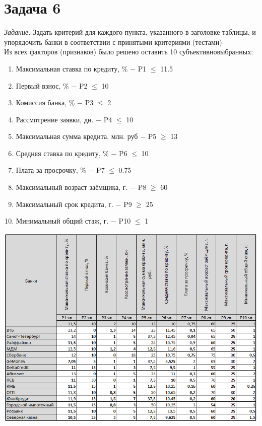 \documentclass[14pt,fleqn]{extarticle}
\begin{document}
	\section*{Задача 6}
	\textit{Задание:} Задать критерий для каждого пункта, указанного в заголовке таблицы, и упорядочить банки в соответствии с принятыми критериями (тестами)\\
	
	Из всех факторов (признаков) было решено оставить 10 субъективновыбранных:
	\begin{enumerate}[nolistsep]
		\item Максимальная ставка по кредиту, \% $-$ P1 $\leq$ 11.5
		\item Первый взнос, \% $-$ P2 $\leq$ 10
		\item Комиссия банка, \% $-$ P3 $\leq$ 2
		\item Рассмотрение заявки, дн. $-$ P4 $\leq$ 10
		\item Максимальная сумма кредита, млн. руб $-$ P5 $\geq$ 13
		\item Средняя ставка по кредиту, \% $-$ P6 $\leq$ 10
		\item Плата за просрочку, \% $-$ P7 $\leq$ 0.75
		\item Максимальный возраст заёмщика, г. $-$ P8 $\geq$ 60
		\item Максимальный срок кредита, г. $-$ P9 $\geq$ 25
		\item Минимальный общий стаж, г. $-$ P10 $\leq$ 1
	\end{enumerate}
	\begin{center}
		\includegraphics[scale=0.76]{1}
	\end{center}
\end{document}
